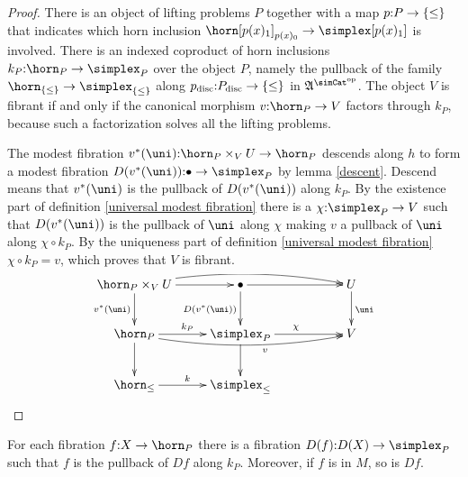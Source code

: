 \documentclass[csh.tex]{subfiles}
\begin{document}
\begin{proof} 
There is an object of lifting problems $P$ together with a map $p\mathord : P\to\left\{\leq\right\}$ that indicates which horn inclusion $\horn[p(x)_1]_{p(x)_0}\to\simplex[p(x)_1]$ is involved.
There is an indexed coproduct of horn inclusions $k_P\of\horn_P\to \simplex_P$ over the object $P$, namely the pullback of the family $\horn_{\set\leq}\to\simplex_{\set\leq}$ along $p_{\rm disc}\mathord : P_{\rm disc}\to\left\{\leq\right\}$ in $\ambient\s$.
The object $V$ is fibrant if and only if the canonical morphism $v\of\horn_P\to V$ factors through $k_P$, because such a factorization solves all the lifting problems.

The modest fibration $v\ri(\uni)\of \horn_P\times_V U \to \horn_P$ descends along $h$ to form a modest fibration $D(v\ri(\uni))\of \bullet\to\simplex_P$ by lemma \ref{descent}. Descend means that $v\ri(\uni)$ is the pullback of $D(v\ri(\uni))$ along $k_P$.
By the existence part of definition \ref{universal modest fibration} there is a $\chi\of\simplex_P\to V$ such that $D(v\ri(\uni))$ is the pullback of $\uni$ along $\chi$ making $v$ a pullback of $\uni$ along $\chi\circ k_P$. By the uniqueness part of definition \ref{universal modest fibration} $\chi\circ k_P=v$, which proves that $V$ is fibrant.
\[\xymatrix{
\horn_P\times_V U \ar@/^2ex/[rrr] \ar[r]\ar[d]_{v\ri(\uni)} & \bullet \ar[rr]\ar[d]_{D(v\ri(\uni))} && U\ar[d]^\uni\\
\horn_P\ar[d]\ar@/_2ex/[rrr]_(.6)v\ar[r]^{k_P} & \simplex_P\ar[d]\ar[rr]^{\chi} && V\\
\horn_\leq\ar[r]^k & \simplex_\leq\\
}\]
\end{proof}

\begin{lemma}
For each fibration $f\of X\to \horn_P$ there is a fibration $D(f)\of D(X)\to\simplex_P$ such that $f$ is the pullback of $Df$ along $k_P$. Moreover, if $f$ is in $M$, so is $Df$.  \label{descent}
\end{lemma}
\end{document}
